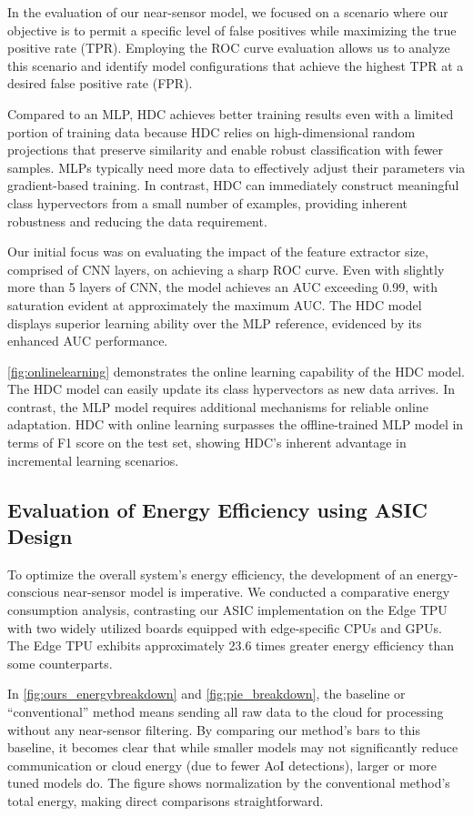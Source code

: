 In the evaluation of our near-sensor model, we focused on a scenario where our objective is to permit a specific level of false positives while maximizing the true positive rate (TPR). Employing the ROC curve evaluation allows us to analyze this scenario and identify model configurations that achieve the highest TPR at a desired false positive rate (FPR).

Compared to an MLP, HDC achieves better training results even with a limited portion of training data because HDC relies on high-dimensional random projections that preserve similarity and enable robust classification with fewer samples. MLPs typically need more data to effectively adjust their parameters via gradient-based training. In contrast, HDC can immediately construct meaningful class hypervectors from a small number of examples, providing inherent robustness and reducing the data requirement.

Our initial focus was on evaluating the impact of the feature extractor size, comprised of CNN layers, on achieving a sharp ROC curve. Even with slightly more than 5 layers of CNN, the model achieves an AUC exceeding 0.99, with saturation evident at approximately the maximum AUC. The HDC model displays superior learning ability over the MLP reference, evidenced by its enhanced AUC performance.

\autoref{fig:onlinelearning} demonstrates the online learning capability of the HDC model. The HDC model can easily update its class hypervectors as new data arrives. In contrast, the MLP model requires additional mechanisms for reliable online adaptation. HDC with online learning surpasses the offline-trained MLP model in terms of F1 score on the test set, showing HDC’s inherent advantage in incremental learning scenarios.


\subsection{Evaluation of Energy Efficiency using ASIC Design}

To optimize the overall system's energy efficiency, the development of an energy-conscious near-sensor model is imperative. We conducted a comparative energy consumption analysis, contrasting our ASIC implementation on the Edge TPU with two widely utilized boards equipped with edge-specific CPUs and GPUs. The Edge TPU exhibits approximately 23.6 times greater energy efficiency than some counterparts.

In \autoref{fig:ours_energybreakdown} and \autoref{fig:pie_breakdown}, the baseline or ``conventional'' method means sending all raw data to the cloud for processing without any near-sensor filtering. By comparing our method’s bars to this baseline, it becomes clear that while smaller models may not significantly reduce communication or cloud energy (due to fewer AoI detections), larger or more tuned models do. The figure shows normalization by the conventional method’s total energy, making direct comparisons straightforward.

